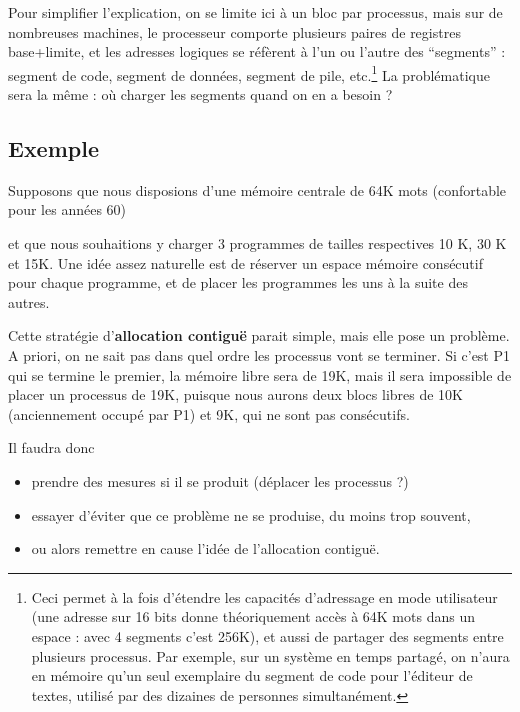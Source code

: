 \begin{multicols}{2}
Pour simplifier l'explication, on se limite ici à un bloc par 
processus, mais
sur de nombreuses machines, le processeur comporte plusieurs paires de
registres base+limite, et les adresses logiques se réfèrent à l'un ou
l'autre des ``segments'' : segment de code, segment de données,
segment de pile, etc.\footnote{Ceci permet à la fois d'étendre les 
capacités
d'adressage en mode utilisateur (une adresse sur 16 bits donne
théoriquement accès à 64K mots dans un espace : avec 4 segments c'est
256K), et aussi de partager des segments entre plusieurs processus.
Par exemple, sur un système en temps partagé, on n'aura
en mémoire qu'un seul exemplaire du segment de code pour l'éditeur 
de textes,  
utilisé par des dizaines de personnes simultanément.} La problématique
sera la même : où charger les segments quand on en a besoin ?


\subsection{Exemple}

Supposons que nous disposions d'une mémoire centrale de 64K mots 
(confortable pour les années 60)


et que nous souhaitions y charger 3 programmes de tailles respectives
10 K, 30 K et 15K. Une idée assez naturelle est de réserver un
espace mémoire consécutif pour chaque programme, et de placer
les programmes les uns à la suite des autres.


Cette stratégie d'\textbf{allocation contiguë} parait simple, mais elle
pose un problème. A priori, on ne sait pas dans quel ordre les
 processus vont se terminer. Si c'est P1 qui se termine le
premier, la mémoire libre sera de 19K, mais il sera impossible de placer
un processus de 19K, puisque nous aurons deux blocs libres de 
10K (anciennement occupé par P1) et 9K, qui ne sont pas consécutifs.

Il faudra donc
\begin{itemize}
\item prendre des mesures si il se produit (déplacer les 
processus ?)
\item essayer d'éviter que ce problème ne se produise, du moins 
trop souvent,
\item ou alors remettre en cause l'idée de l'allocation contiguë.
\end{itemize}



\end{multicols}
